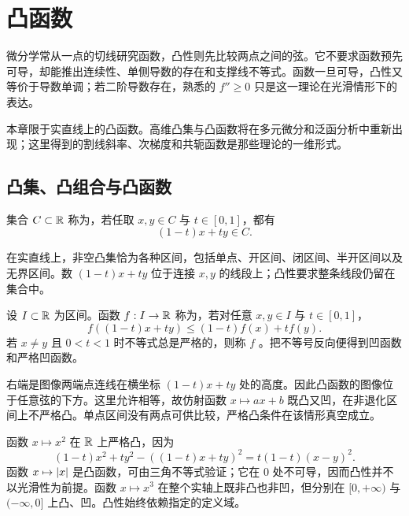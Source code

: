 \chapter{凸函数}
\label{chap:convex-functions}

微分学常从一点的切线研究函数，凸性则先比较两点之间的弦。它不要求函数预先可导，却能推出连续性、单侧导数的存在和支撑线不等式。函数一旦可导，凸性又等价于导数单调；若二阶导数存在，熟悉的 \(f''\ge 0\) 只是这一理论在光滑情形下的表达。

本章限于实直线上的凸函数。高维凸集与凸函数将在多元微分和泛函分析中重新出现；这里得到的割线斜率、次梯度和共轭函数是那些理论的一维形式。

\section{凸集、凸组合与凸函数}

\begin{definition}[凸集]
集合 \(C\subset\mathbb{R}\) 称为，若任取 \(x,y\in C\) 与 \(t\in[0,1]\)，都有
\[
 (1-t)x+ty\in C.
\]
\end{definition}

在实直线上，非空凸集恰为各种区间，包括单点、开区间、闭区间、半开区间以及无界区间。数 \((1-t)x+ty\) 位于连接 \(x,y\) 的线段上；凸性要求整条线段仍留在集合中。

\begin{definition}[凸函数]
设 \(I\subset\mathbb{R}\) 为区间。函数 \(f:I\to\mathbb{R}\) 称为，若对任意 \(x,y\in I\) 与 \(t\in[0,1]\)，
\begin{equation}
 f((1-t)x+ty)\le (1-t)f(x)+t f(y).
 \label{eq:convex-two-point}
\end{equation}
若 \(x\ne y\) 且 \(0<t<1\) 时不等式总是严格的，则称 \(f\) 。把不等号反向便得到凹函数和严格凹函数。
\end{definition}

右端是图像两端点连线在横坐标 \((1-t)x+ty\) 处的高度。因此凸函数的图像位于任意弦的下方。这里允许相等，故仿射函数 \(x\mapsto ax+b\) 既凸又凹，在非退化区间上不严格凸。单点区间没有两点可供比较，严格凸条件在该情形真空成立。

\begin{example}
函数 \(x\mapsto x^2\) 在 \(\mathbb{R}\) 上严格凸，因为
\[
 (1-t)x^2+ty^2-((1-t)x+ty)^2=t(1-t)(x-y)^2.
\]
函数 \(x\mapsto \left|x\right|\) 是凸函数，可由三角不等式验证；它在 \(0\) 处不可导，因而凸性并不以光滑性为前提。函数 \(x\mapsto x^3\) 在整个实轴上既非凸也非凹，但分别在 \([0,+\infty)\) 与 \((-\infty,0]\) 上凸、凹。凸性始终依赖指定的定义域。
\end{example}

